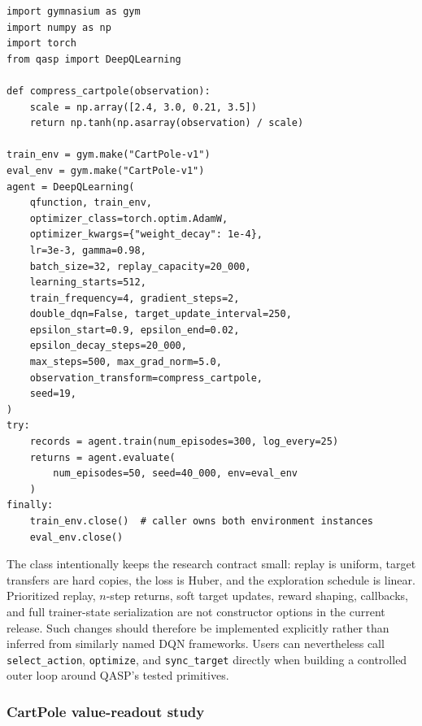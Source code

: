 \documentclass[10pt]{article}
\newcommand{\code}[1]{\texttt{#1}}
\begin{document}
\begin{lstlisting}[caption={Customizing optimization, replay cadence,
exploration, preprocessing, and environment ownership in
\code{DeepQLearning}.},label={lst:deepq-customization}]
import gymnasium as gym
import numpy as np
import torch
from qasp import DeepQLearning

def compress_cartpole(observation):
    scale = np.array([2.4, 3.0, 0.21, 3.5])
    return np.tanh(np.asarray(observation) / scale)

train_env = gym.make("CartPole-v1")
eval_env = gym.make("CartPole-v1")
agent = DeepQLearning(
    qfunction, train_env,
    optimizer_class=torch.optim.AdamW,
    optimizer_kwargs={"weight_decay": 1e-4},
    lr=3e-3, gamma=0.98,
    batch_size=32, replay_capacity=20_000,
    learning_starts=512,
    train_frequency=4, gradient_steps=2,
    double_dqn=False, target_update_interval=250,
    epsilon_start=0.9, epsilon_end=0.02,
    epsilon_decay_steps=20_000,
    max_steps=500, max_grad_norm=5.0,
    observation_transform=compress_cartpole,
    seed=19,
)
try:
    records = agent.train(num_episodes=300, log_every=25)
    returns = agent.evaluate(
        num_episodes=50, seed=40_000, env=eval_env
    )
finally:
    train_env.close()  # caller owns both environment instances
    eval_env.close()
\end{lstlisting}

The class intentionally keeps the research contract small: replay is uniform,
target transfers are hard copies, the loss is Huber, and the exploration
schedule is linear.  Prioritized replay, $n$-step returns, soft target updates,
reward shaping, callbacks, and full trainer-state serialization are not
constructor options in the current release.  Such changes should therefore be
implemented explicitly rather than inferred from similarly named DQN
frameworks.  Users can nevertheless call \code{select\_action},
\code{optimize}, and \code{sync\_target} directly when building a controlled
outer loop around QASP's tested primitives.

\subsubsection{CartPole value-readout study}
\label{sec:pqdqn-cartpole-results}
\end{document}
